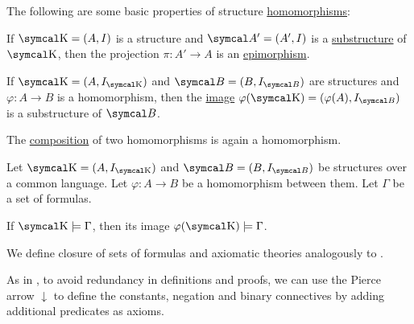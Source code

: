 \begin{proposition}\label{thm:first_order_homomorphism_properties}
  The following are some basic properties of structure \hyperref[def:first_order_homomorphism]{homomorphisms}:
  \begin{DefEnum}
     If \( \CK = (A, I) \) is a structure and \( \Cal{A'} = (A', I) \) is a \hyperref[def:first_order_substructure]{substructure} of \( \CK \), then the projection \( \pi: A' \to A \) is an \hyperref[def:first_order_homomorphism/projection]{epimorphism}.

     If \( \CK = (A, I_{\CK}) \) and \( \Cal{B} = (B, I_{\Cal{B}}) \) are structures and \( \varphi: A \to B \) is a homomorphism, then the \hyperref[def:function]{image} \( \varphi(\CK) = (\varphi(A), I_{\Cal{B}}) \) is a substructure of \( \Cal{B} \).

     The \hyperref[def:function/composition]{composition} of two homomorphisms is again a homomorphism.
  \end{DefEnum}
\end{proposition}

\begin{proposition}\label{thm:first_order_homomorphism_preserves_models}
  Let \( \CK = (A, I_{\CK}) \) and \( \Cal{B} = (B, I_{\Cal{B}}) \) be structures over a common language. Let \( \varphi: A \to B \) be a homomorphism between them. Let \( \Gamma \) be a set of formulas.

  If \( \CK \models \Gamma \), then its image \( \varphi(\CK) \models \Gamma \).
\end{proposition}

\begin{definition}\label{def:first_order_theory}
  We define closure of sets of formulas and axiomatic theories analogously to .
\end{definition}

\begin{remark}\label{remark:minimal_first_order_language}
  As in , to avoid redundancy in definitions and proofs, we can use the Pierce arrow \( \downarrow \) to define the constants, negation and binary connectives by adding additional predicates as axioms.
\end{remark}

